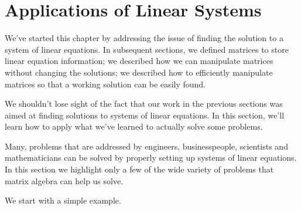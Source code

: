\section{Applications of Linear Systems}\label{sec:solving_systems}


We've started this chapter by addressing the issue of finding the solution to a system of linear equations. In subsequent sections, we  defined matrices to store linear equation information; we described how we can manipulate matrices without changing the solutions; we described how to efficiently manipulate matrices so that a working solution can be easily found.

We shouldn't lose sight of the fact that  our work in the previous sections was aimed at finding solutions to systems of linear equations. In this section, we'll learn how to apply what we've learned to actually solve some problems. 

Many, problems that are addressed by engineers, businesspeople, scientists and mathematicians can be solved by properly setting up systems of linear equations. In this section we highlight only a few of the wide variety of problems that matrix algebra can help us solve.

We start with a simple example.

\medskip

